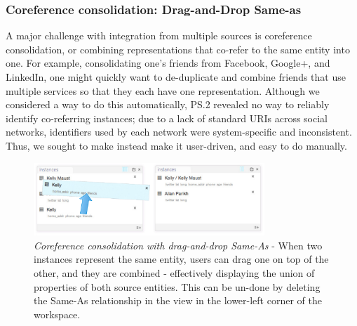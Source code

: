 \documentclass{sigchi}
\begin{document}
%
%
%
\subsubsection{Coreference consolidation: Drag-and-Drop Same-as}

A major challenge with integration from multiple sources is coreference consolidation, or combining representations that co-refer to the same entity into one.  For example, consolidating one's friends from Facebook, Google+, and LinkedIn, one might quickly want to de-duplicate and combine friends that use multiple services so that they each have one representation.  Although we considered a way to do this automatically, PS.2 revealed no way to reliably identify co-referring instances; due to a lack of standard URIs across social networks, identifiers used by each network were system-specific and inconsistent. Thus, we sought to make instead make it user-driven, and easy to do manually.  

\begin{figure}[htbp]
\begin{center}
\includegraphics[width=8.7cm]{img/sameas}
\caption{\emph{Coreference consolidation with drag-and-drop Same-As} - When two instances represent the same entity, users can drag one on top of the other, and they are combined - effectively displaying the union of properties of both source entities. This can be un-done by deleting the Same-As relationship in the view in the lower-left corner of the workspace.}
\label{fig:sameas}
\end{center}
\end{figure}
\end{document}
